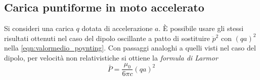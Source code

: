 \subsection{Carica puntiforme in moto accelerato}
Si consideri una carica $q$ dotata di accelerazione $a$. È possibile usare gli stessi risultati ottenuti nel caso del
dipolo oscillante a patto di sostituire $\ddot{p}^2$ con $(qa)^2$ nella \eqref{eqn:valormedio_poynting}.
Con passaggi analoghi a quelli visti nel caso del dipolo, per velocità non relativistiche si ottiene la \textit{formula di Larmor}
\begin{equation}
    \bar{P}=\frac{\mu_0}{6\pi c}(qa)^2
\end{equation}
